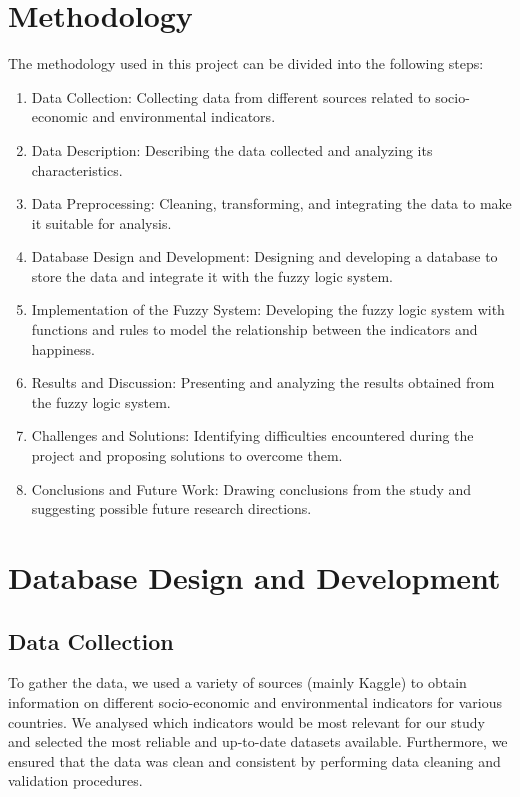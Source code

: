 \documentclass[fleqn,11pt]{article}
\begin{document}
\section{Methodology}

The methodology used in this project can be divided into the following steps:

\begin{enumerate}
	\item Data Collection: Collecting data from different sources related to socio-economic and environmental indicators.
	\item Data Description: Describing the data collected and analyzing its characteristics.
	\item Data Preprocessing: Cleaning, transforming, and integrating the data to make it suitable for analysis.
	\item Database Design and Development: Designing and developing a database to store the data and integrate it with the fuzzy logic system.
	\item Implementation of the Fuzzy System: Developing the fuzzy logic system with functions and rules to model the relationship between the indicators and happiness.
	\item Results and Discussion: Presenting and analyzing the results obtained from the fuzzy logic system.
	\item Challenges and Solutions: Identifying difficulties encountered during the project and proposing solutions to overcome them.
	\item Conclusions and Future Work: Drawing conclusions from the study and suggesting possible future research directions.
\end{enumerate}



\section{Database Design and Development}


\subsection{Data Collection}
To gather the data, we used a variety of sources (mainly Kaggle) to obtain information on different socio-economic and environmental indicators for various countries.
We analysed which indicators would be most relevant for our study and selected the most reliable and up-to-date datasets available.
Furthermore, we ensured that the data was clean and consistent by performing data cleaning and validation procedures.
\end{document}
